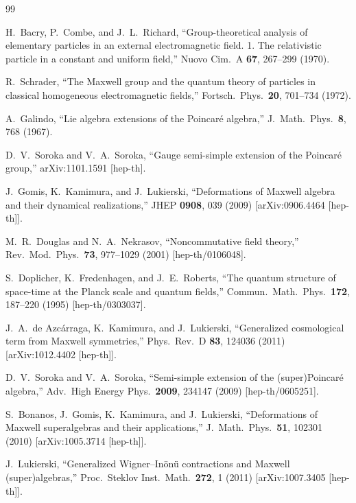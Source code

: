 \documentclass[11pt, a4paper]{article}
\begin{document}
\begin{thebibliography}{99}

  H.~Bacry, P.~Combe, and J.~L.~Richard,
  ``Group-theoretical analysis of elementary particles in an external electromagnetic field. 1. The relativistic particle in a constant and uniform field,''
  Nuovo Cim.\ A \textbf{67}, 267--299 (1970).

  R.~Schrader,
  ``The Maxwell group and the quantum theory of particles in classical homogeneous electromagnetic fields,''
  Fortsch.\ Phys.\ \textbf{20}, 701--734 (1972).

  A.~Galindo,
  ``Lie algebra extensions of the Poincar\'e algebra,''
  J.\ Math.\ Phys.\ \textbf{8}, 768 (1967).

  D.~V.~Soroka and V.~A.~Soroka,
  ``Gauge semi-simple extension of the Poincar\'e group,''
  arXiv:1101.1591 [hep-th].

  J.~Gomis, K.~Kamimura, and J.~Lukierski,
  ``Deformations of Maxwell algebra and their dynamical realizations,''
  JHEP \textbf{0908}, 039 (2009) [arXiv:0906.4464 [hep-th]].

  M.~R.~Douglas and N.~A.~Nekrasov,
  ``Noncommutative field theory,''
  Rev.\ Mod.\ Phys.\ \textbf{73}, 977--1029 (2001) [hep-th/0106048].

  S.~Doplicher, K.~Fredenhagen, and J.~E.~Roberts,
  ``The quantum structure of space-time at the Planck scale and quantum fields,''
  Commun.\ Math.\ Phys.\ \textbf{172}, 187--220 (1995) [hep-th/0303037].

  J.~A.~de Azc\'arraga, K.~Kamimura, and J.~Lukierski,
  ``Generalized cosmological term from Maxwell symmetries,''
  Phys.\ Rev.\ D \textbf{83}, 124036 (2011) [arXiv:1012.4402 [hep-th]].

  D.~V.~Soroka and V.~A.~Soroka,
  ``Semi-simple extension of the (super)Poincar\'e algebra,''
  Adv.\ High Energy Phys.\ \textbf{2009}, 234147 (2009) [hep-th/0605251].

  S.~Bonanos, J.~Gomis, K.~Kamimura, and J.~Lukierski,
  ``Deformations of Maxwell superalgebras and their applications,''
  J.\ Math.\ Phys.\ \textbf{51}, 102301 (2010) [arXiv:1005.3714 [hep-th]].

  J.~Lukierski,
  ``Generalized Wigner--In\"on\"u contractions and Maxwell (super)algebras,''
  Proc.\ Steklov Inst.\ Math.\ \textbf{272}, 1 (2011) [arXiv:1007.3405 [hep-th]].


\end{thebibliography}
\end{document}
